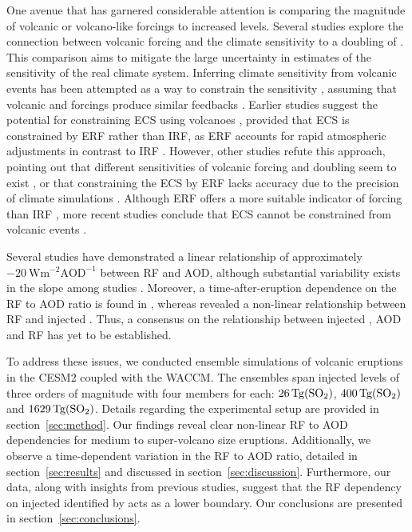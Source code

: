 \documentclass[draft]{agujournal2019}
\newcommand{\iso}[1][i]{{#1}njected \ce{SO2}}
\begin{document}
One avenue that has garnered considerable attention is comparing the magnitude of
volcanic or volcano-like forcings to increased  levels. Several studies explore
the connection between volcanic forcing and the climate sensitivity to a doubling of
\cite{boer2007,marvel2016,merlis2014,ollila2016,richardson2019,salvi2022,wigley2005}.
This comparison aims to mitigate the large uncertainty in estimates of the sensitivity
of the real climate system. Inferring climate sensitivity from volcanic events has been
attempted as a way to constrain the sensitivity \cite{boer2007}, assuming that volcanic
and  forcings produce similar feedbacks \cite{pauling2023}. Earlier studies
suggest the potential for constraining ECS using volcanoes \cite{bender2010}, provided
that ECS is constrained by ERF rather than IRF, as ERF accounts for rapid atmospheric
adjustments in contrast to IRF \cite{richardson2019}. However, other studies refute this
approach, pointing out that different sensitivities of volcanic forcing and 
doubling seem to exist \cite{douglass2006}, or that constraining the ECS by ERF lacks
accuracy due to the precision of climate simulations \cite{boer2007,salvi2022}. Although
ERF offers a more suitable indicator of forcing than IRF
\cite{marvel2016,richardson2019}, more recent studies conclude that ECS cannot be
constrained from volcanic events \cite{pauling2023}.

Several studies have demonstrated a linear relationship of approximately
\(-\SI{20}{\watt\metre^{-2}\mathrm{AOD}^{-1}}\) between RF and AOD, although substantial
variability exists in the slope among studies
\cite{mills2017,hansen2005,gregory2016,marshall2020,pitari2016b}. Moreover, a
time-after-eruption dependence on the RF to AOD ratio is found in ,
whereas  revealed a non-linear relationship between RF and \iso{}.
Thus, a consensus on the relationship between \iso{}, AOD and RF has yet to be
established.

To address these issues, we conducted ensemble simulations of volcanic eruptions in the
CESM2 coupled with the WACCM. The ensembles span \iso{} levels of three orders of
magnitude with four members for each: \(\SI{26}{\tera\gram(\ce{SO2})}\),
\(\SI{400}{\tera\gram(\ce{SO2})}\) and \(\SI{1629}{\tera\gram(\ce{SO2})}\). Details
regarding the experimental setup are provided in section~\ref{sec:method}. Our findings
reveal clear non-linear RF to AOD dependencies for medium to super-volcano size
eruptions. Additionally, we observe a time-dependent variation in the RF to AOD ratio,
detailed in section~\ref{sec:results} and discussed in section~\ref{sec:discussion}.
Furthermore, our data, along with insights from previous studies, suggest that the RF
dependency on \iso{} identified by  acts as a lower boundary. Our
conclusions are presented in section~\ref{sec:conclusions}.
\end{document}
